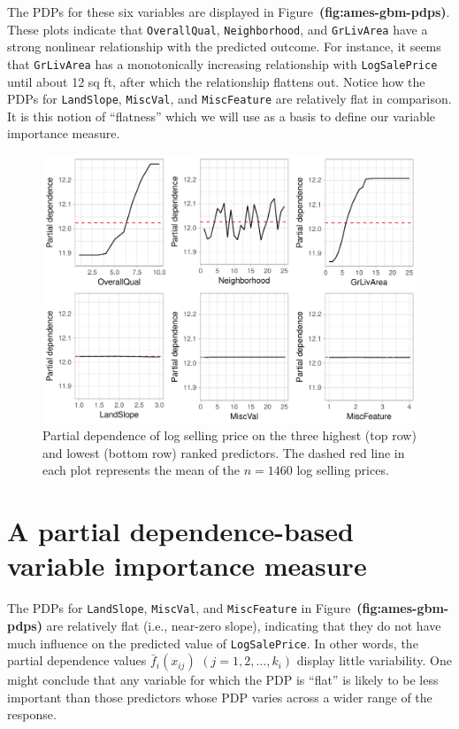 \documentclass[12pt]{article}
\def\code#1{\texttt{#1}}
\def\ref#1{\textbf{(#1)}}
\begin{document}
The PDPs for these six variables are displayed in Figure~\ref{fig:ames-gbm-pdps}. These plots indicate that \code{OverallQual}, \code{Neighborhood}, and \code{GrLivArea} have a strong nonlinear relationship with the predicted outcome. For instance, it seems that \code{GrLivArea} has a monotonically increasing relationship with \code{LogSalePrice} until about 12 sq ft, after which the relationship flattens out. Notice how the PDPs for \code{LandSlope}, \code{MiscVal}, and \code{MiscFeature} are relatively flat in comparison. It is this notion of ``flatness'' which we will use as a basis to define our variable importance measure.

\begin{figure}[!htb]
  \centering
  \includegraphics[width=1.0\textwidth]{ames-gbm-pdps}
  \caption{Partial dependence of log selling price on the three highest (top row) and lowest (bottom row) ranked predictors. The dashed red line in each plot represents the mean of the $n = 1460$ log selling prices. \label{fig:ames-gbm-pdps}}
\end{figure}


\section{A partial dependence-based variable importance measure}
\label{sec:new}

The PDPs for \code{LandSlope}, \code{MiscVal}, and \code{MiscFeature} in Figure~\ref{fig:ames-gbm-pdps} are relatively flat (i.e., near-zero slope), indicating that they do not have much influence on the predicted value of \code{LogSalePrice}. In other words, the partial dependence values $\bar{f}_i\left(x_{ij}\right)$ $\left(j = 1, 2, \dots, k_i\right)$ display little variability. One might conclude that any variable for which the PDP is ``flat'' is likely to be less important than those predictors whose PDP varies across a wider range of the response.
\end{document}
